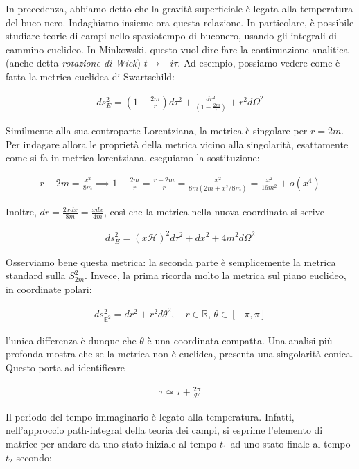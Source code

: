 \documentclass{report}
\begin{document}
In precedenza, abbiamo detto che la gravità superficiale è legata alla temperatura del buco nero. Indaghiamo insieme ora questa relazione. In particolare, è possibile studiare teorie di campi nello spaziotempo di buconero, usando gli integrali di cammino euclideo. In Minkowski, questo vuol dire fare la continuazione analitica (anche detta \emph{rotazione di Wick}) \(t \rightarrow -i\tau\). Ad esempio, possiamo vedere come è fatta la metrica euclidea di Swartschild: 

\begin{align}
    ds^2_E = \left(1-\frac{2m}{r} \right)d\tau^2 + \frac{dr^2}{\left(1-\frac{2m}{r} \right)} + r^2d\Omega^2
\end{align}

Similmente alla sua controparte Lorentziana, la metrica è singolare per \(r = 2m\). Per indagare allora le proprietà della metrica vicino alla singolarità, esattamente come si fa in metrica lorentziana, eseguiamo la sostituzione: 

\begin{align}
    r -2m = \frac{x^2}{8m} \implies 1 - \frac{2m}{r} = \frac{r-2m}{r} = \frac{x^2}{8m(2m+x^2/8m)} = \frac{x^2}{16m^2} + o(x^4)
\end{align}

Inoltre, \(dr = \frac{2xdx}{8m} = \frac{xdx}{4m}\), così che la metrica nella nuova coordinata si scrive 

\begin{align}
    ds^2_E = (x\mathcal{H})^2d\tau^2 + dx^2 + 4m^2d\Omega^2
\end{align}

Osserviamo bene questa metrica: la seconda parte è semplicemente la metrica standard sulla \(S^2_{2m}\). Invece, la prima ricorda molto la metrica sul piano euclideo, in coordinate polari: 

\begin{align}
    ds^2_{\mathbb{E}^2} = dr^2 + r^2 d\theta^2, \quad r \in \mathbb{R}, \, \theta \in [-\pi, \pi]
\end{align}

l'unica differenza è dunque che \(\theta\) è una coordinata compatta. Una analisi più profonda mostra che se la metrica non è euclidea, presenta una singolarità conica. Questo porta ad identificare 

\begin{align}
    \tau \simeq \tau + \frac{2\pi}{\mathcal{H}}
\end{align}

Il periodo del tempo immaginario è legato alla temperatura. Infatti, nell'approccio path-integral della teoria dei campi, si esprime l'elemento di matrice per andare da uno stato iniziale al tempo \(t_1\) ad uno stato finale al tempo \(t_2\) secondo: 
\end{document}
